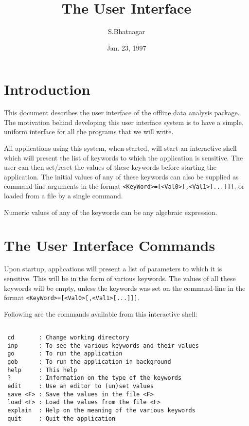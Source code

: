 \documentclass[11pt]{article}
\begin{document}
\rm

\title{\bf The User Interface}
\author{S.Bhatnagar}
\date{Jan. 23, 1997}
\maketitle
\begin{center}
\end{center}


\normalsize
\rm

\section{Introduction}

This document describes the user interface of the offline data
analysis package.  The motivation behind developing this user
interface system is to have a simple, uniform interface for all the
programs that we will write.

All applications using this system, when started, will start an
interactive shell which will present the list of keywords to which the
application is sensitive.  The user can then set/reset the values of
these keywords before starting the application.  The initial values of
any of these keywords can also be supplied as command-line arguments
in the format {\tt <KeyWord>=[<Val0>[,<Val1>[...]]]}, or loaded from a
file by a single command.

Numeric values of any of the keywords can be any algebraic expression.



\section{The User Interface Commands}

Upon startup, applications will present a list of parameters to which it
is sensitive.  This will be in the form of various keywords.  The
values of all these keywords will be empty, unless the keywords was
set on the command-line in the format
{\tt <KeyWord>=[<Val0>[,<Val1>[...]]]}.  

Following are the commands available from this interactive shell:

\begin{verbatim}

 cd       : Change working directory
 inp      : To see the various keywords and their values
 go       : To run the application
 gob      : To run the application in background
 help     : This help
 ?        : Information on the type of the keywords
 edit     : Use an editor to (un)set values
 save <F> : Save the values in the file <F>
 load <F> : Load the values from the file <F>
 explain  : Help on the meaning of the various keywords
 quit     : Quit the application

\end{verbatim}
\end{document}
